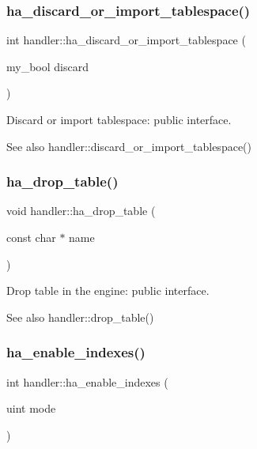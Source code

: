\subsubsection{\texorpdfstring{ha\+\_\+discard\+\_\+or\+\_\+import\+\_\+tablespace()}{ha\_discard\_or\_import\_tablespace()}}
{\footnotesize\ttfamily int handler\+::ha\+\_\+discard\+\_\+or\+\_\+import\+\_\+tablespace (\begin{DoxyParamCaption}\item[{my\+\_\+bool}]{discard }\end{DoxyParamCaption})}

Discard or import tablespace\+: public interface.

\begin{DoxySeeAlso}{See also}
handler\+::discard\+\_\+or\+\_\+import\+\_\+tablespace() 
\end{DoxySeeAlso}
\mbox{\label{classhandler_a6bcc37ec84386f5d6cc86448781666cb}} 
\subsubsection{\texorpdfstring{ha\+\_\+drop\+\_\+table()}{ha\_drop\_table()}}
{\footnotesize\ttfamily void handler\+::ha\+\_\+drop\+\_\+table (\begin{DoxyParamCaption}\item[{const char $\ast$}]{name }\end{DoxyParamCaption})}

Drop table in the engine\+: public interface.

\begin{DoxySeeAlso}{See also}
handler\+::drop\+\_\+table() 
\end{DoxySeeAlso}
\mbox{\label{classhandler_a36e9c53758728e07eb37cbb65ea3ab50}} 
\subsubsection{\texorpdfstring{ha\+\_\+enable\+\_\+indexes()}{ha\_enable\_indexes()}}
{\footnotesize\ttfamily int handler\+::ha\+\_\+enable\+\_\+indexes (\begin{DoxyParamCaption}\item[{uint}]{mode }\end{DoxyParamCaption})}

